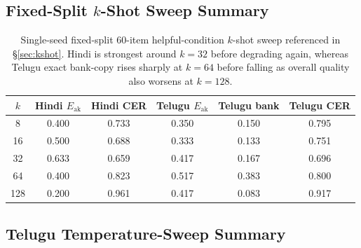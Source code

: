 \documentclass{article}
\begin{document}
\clearpage
{}
\subsection{Fixed-Split $k$-Shot Sweep Summary}\label{app:kshot}

\begin{table}[t]
\centering
\small
\setlength{\tabcolsep}{8pt}
\begin{tabular}{cccccc}
\toprule
\textbf{$k$} & \textbf{Hindi $E_{\mathrm{ak}}$} & \textbf{Hindi CER} & \textbf{Telugu $E_{\mathrm{ak}}$} & \textbf{Telugu bank} & \textbf{Telugu CER} \\
\midrule
8   & 0.400 & 0.733 & 0.350 & 0.150 & 0.795 \\
16  & 0.500 & 0.688 & 0.333 & 0.133 & 0.751 \\
32  & 0.633 & 0.659 & 0.417 & 0.167 & 0.696 \\
64  & 0.400 & 0.823 & 0.517 & 0.383 & 0.800 \\
128 & 0.200 & 0.961 & 0.417 & 0.083 & 0.917 \\
\bottomrule
\end{tabular}
\caption{Single-seed fixed-split 60-item helpful-condition $k$-shot sweep referenced in \S\ref{sec:kshot}. Hindi is strongest around $k{=}32$ before degrading again, whereas Telugu exact bank-copy rises sharply at $k{=}64$ before falling as overall quality also worsens at $k{=}128$.}
\label{tab:kshot}
\end{table}

\subsection{Telugu Temperature-Sweep Summary}\label{app:tempsweep}
\end{document}
